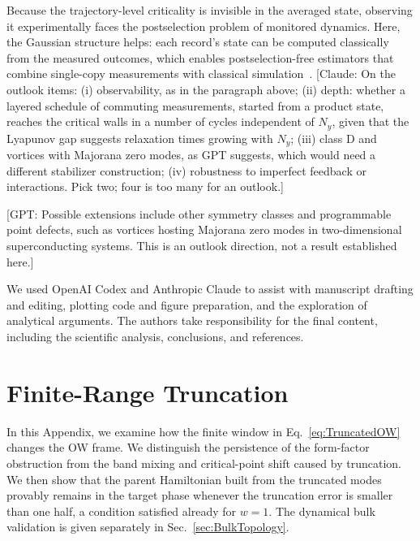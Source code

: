 \documentclass[aps,prb,10pt,twocolumn,superscriptaddress,longbibliography,floatfix]{revtex4-2}
\newcommand{\GPT}[1]{{\color{magenta}[GPT: #1]}}
\newcommand{\claudeadd}[1]{{\color{orange}#1}}
\newcommand{\claudecom}[1]{{\color{ForestGreen}[Claude: #1]}}
\begin{document}
\claudeadd{Because the trajectory-level criticality is invisible in the averaged state, observing it experimentally faces the postselection problem of monitored dynamics. Here, the Gaussian structure helps: each record's state can be computed classically from the measured outcomes, which enables postselection-free estimators that combine single-copy measurements with classical simulation~\cite{GarrattAltman2024,McGinley2024}.}
\claudecom{On the outlook items: (i) observability, as in the paragraph above; (ii) depth: whether a layered schedule of commuting measurements, started from a product state, reaches the critical walls in a number of cycles independent of $N_y$, given that the Lyapunov gap suggests relaxation times growing with $N_y$; (iii) class D and vortices with Majorana zero modes, as GPT suggests, which would need a different stabilizer construction; (iv) robustness to imperfect feedback or interactions. Pick two; four is too many for an outlook.}

\GPT{Possible extensions include other symmetry classes and programmable point defects, such as vortices hosting Majorana zero modes in two-dimensional superconducting systems. This is an outlook direction, not a result established here.}


{\color{blue}
\begin{acknowledgments}
We used OpenAI Codex and Anthropic Claude to assist with manuscript drafting and editing, plotting code and figure preparation, and the exploration of analytical arguments. The authors take responsibility for the final content, including the scientific analysis, conclusions, and references.
\end{acknowledgments}
}

\FloatBarrier
\appendix
\setcounter{figure}{0}
\renewcommand{\thefigure}{A\arabic{figure}}
\renewcommand{\theHfigure}{A\arabic{figure}}

{\color{blue}\section{Finite-Range Truncation}
\label{app:Truncation}}

{\color{blue}
In this Appendix, we examine how the finite window in Eq.~\eqref{eq:TruncatedOW} changes the OW frame. We distinguish the persistence of the form-factor obstruction from the band mixing and critical-point shift caused by truncation. \claudeadd{We then show that the parent Hamiltonian built from the truncated modes provably remains in the target phase whenever the truncation error is smaller than one half, a condition satisfied already for $w=1$.} The dynamical bulk validation is given separately in Sec.~\ref{sec:BulkTopology}.
}
\end{document}
